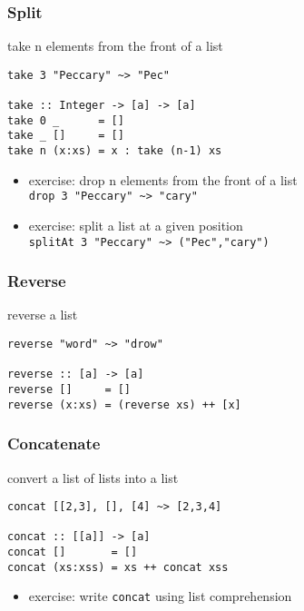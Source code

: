 \documentclass[dvipsnames]{beamer}
\theoremstyle{plain}
\begin{document}
\begin{frame}[fragile]
  \frametitle{Split}

  \begin{exampleblock}{take n elements from the front of a list}
    \begin{lstlisting}
take 3 "Peccary" ~> "Pec"

take :: Integer -> [a] -> [a]
take 0 _      = []
take _ []     = []
take n (x:xs) = x : take (n-1) xs
    \end{lstlisting}
  \end{exampleblock}

  \pause
  \begin{itemize}
    \item exercise: drop n elements from the front of a list\\
      \lstinline{drop 3 "Peccary" ~> "cary"}
    \item exercise: split a list at a given position\\
      \lstinline{splitAt 3 "Peccary" ~> ("Pec","cary")}
  \end{itemize}
\end{frame}

\begin{frame}[fragile]
  \frametitle{Reverse}

  \begin{exampleblock}{reverse a list}
    \begin{lstlisting}
reverse "word" ~> "drow"

reverse :: [a] -> [a]
reverse []     = []
reverse (x:xs) = (reverse xs) ++ [x]
    \end{lstlisting}
  \end{exampleblock}
\end{frame}

\begin{frame}[fragile]
  \frametitle{Concatenate}

  \begin{exampleblock}{convert a list of lists into a list}
    \begin{lstlisting}
concat [[2,3], [], [4] ~> [2,3,4]

concat :: [[a]] -> [a]
concat []       = []
concat (xs:xss) = xs ++ concat xss
    \end{lstlisting}
  \end{exampleblock}

  \pause
  \begin{itemize}
    \item exercise: write \lstinline{concat} using list comprehension
  \end{itemize}
\end{frame}
\end{document}
